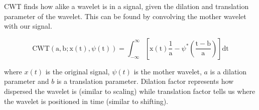 \begin{enumerate}
	CWT finds how alike a wavelet is in a signal, given the dilation and translation parameter of the wavelet. 
	This can be found by convolving the mother wavelet with our signal.

	\begin{equation*} 
		\text{CWT}(\mathrm{a},\mathrm{b}; \mathrm{x}(\mathrm{t}),\psi(\mathrm{t}))=\int_{-\infty}^{\infty}[\mathrm{x}(\mathrm{t})\frac{1}{\mathrm{a}}-\psi^{*}(\frac{\mathrm{t}-\mathrm{b}}{\mathrm{a}})]\text{dt}
	\end{equation*}

	where $x(t)$ is the original signal, $\psi(t)$ is the mother wavelet, $a$ is a dilation parameter and $b$ is a translation parameter.
	Dilation factor represents how dispersed the wavelet is (similar to scaling) while translation factor tells us where the wavelet is
	positioned in time (similar to shifting). 
	

\end{enumerate}
